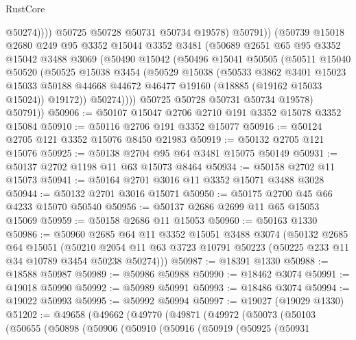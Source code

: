\begin{lexlean}{RustCore}
\begin{coremodule}
                    @50274))))
            @50725
            @50728
            @50731
            @50734
            @19578)
          @50791))
      (@50739
        @15018
        @2680
        @249
        @95
        @3352
        @15044
        @3352
        @3481
        (@50689
          @2651
          @65
          @95
          @3352
          @15042
          @3488
          @3069
          (@50490
            @15042
            (@50496
              @15041
              @50505
              (@50511
                @15040
                @50520
                (@50525
                  @15038
                  @3454
                  (@50529
                    @15038
                    (@50533
                      @3862
                      @3401
                      @15023
                      @15033
                      @50188
                      @44668
                      @44672
                      @46477
                      @19160
                      (@18885 (@19162 @15033 @15024))
                      @19172))
                  @50274))))
          @50725
          @50728
          @50731
          @50734
          @19578)
        @50791))
@50906 := @50107 @15047 @2706 @2710 @191 @3352 @15078 @3352 @15084
@50910 := @50116 @2706 @191 @3352 @15077
@50916 := @50124 @2705 @121 @3352 @15076 @8450 @21983
@50919 := @50132 @2705 @121 @15076
@50925 := @50138 @2704 @95 @64 @3481 @15075 @50149
@50931 := @50137 @2702 @1198 @11 @63 @15073 @8464
@50934 := @50158 @2702 @11 @15073
@50941 := @50164 @2701 @3016 @11 @3352 @15071 @3488 @3028
@50944 := @50132 @2701 @3016 @15071
@50950 := @50175 @2700 @45 @66 @4233 @15070 @50540
@50956 := @50137 @2686 @2699 @11 @65 @15053 @15069
@50959 := @50158 @2686 @11 @15053
@50960 := @50163 @1330
@50986 := @50960
    @2685
    @64
    @11
    @3352
    @15051
    @3488
    @3074
    (@50132
      @2685
      @64
      @15051
      (@50210 @2054 @11 @63 @3723 @10791 @50223 (@50225 @233 @11 @34 @10789 @3454 @50238 @50274)))
@50987 := @18391 @1330
@50988 := @18588 @50987
@50989 := @50986 @50988
@50990 := @18462 @3074
@50991 := @19018 @50990
@50992 := @50989 @50991
@50993 := @18486 @3074
@50994 := @19022 @50993
@50995 := @50992 @50994
@50997 := @19027 (@19029 @1330)
@51202 := @49658
    (@49662
      (@49770
        (@49871
          (@49972
            (@50073
              (@50103
                (@50655
                  (@50898
                    (@50906
                      (@50910
                        (@50916
                          (@50919
                            (@50925
                              (@50931

\end{coremodule}
\end{lexlean}
